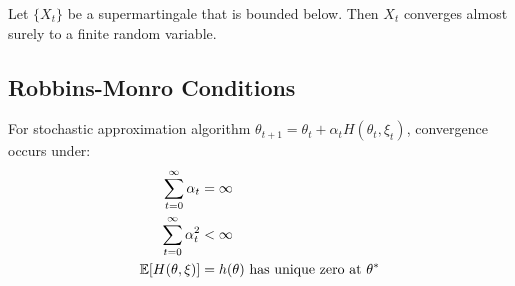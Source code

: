 \begin{theorem}
Let $\{X_t\}$ be a supermartingale that is bounded below. Then $X_t$ converges almost surely to a finite random variable.
\end{theorem}

\subsection{Robbins-Monro Conditions}

For stochastic approximation algorithm $\theta_{t+1} = \theta_t + \alpha_t H(\theta_t, \xi_t)$, convergence occurs under:
\begin{align}
\sum_{t=0}^\infty \alpha_t &= \infty \\
\sum_{t=0}^\infty \alpha_t^2 &< \infty \\
\mathbb{E}[H(\theta, \xi)] &= h(\theta) \text{ has unique zero at } \theta^*
\end{align}